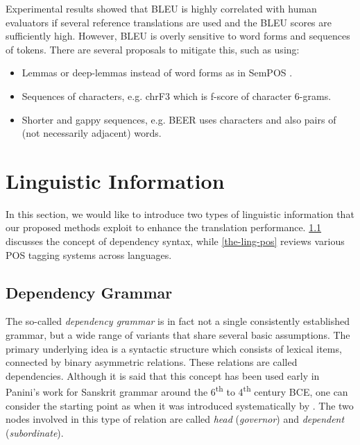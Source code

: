 Experimental results showed that BLEU is highly correlated with human evaluators if several reference translations are used and the BLEU scores are sufficiently high.
However, BLEU is overly sensitive to word forms and sequences of tokens.
There are several proposals to mitigate this, such as using:

\begin{itemize}
    \item Lemmas or deep-lemmas instead of word forms as in SemPOS \citep{Kos09evaluationof}.
    \item Sequences of characters, e.g. chrF3 \citep{chrf3} which is f-score of character 6-grams.
    \item Shorter and gappy sequences, e.g. BEER \citep{beer} uses characters and also pairs of (not necessarily adjacent) words.

\end{itemize}

\section{Linguistic Information}
\label{the-ling}

In this section, we would like to introduce two types of linguistic information that our proposed methods exploit to enhance the translation performance.
\cref{the-ling-dep} discusses the concept of dependency syntax, while \cref{the-ling-pos} reviews various POS tagging systems across languages.

\subsection{Dependency Grammar}
\label{the-ling-dep}

The so-called \textit{dependency grammar} is in fact not a single consistently established grammar, but a wide range of variants that share several basic assumptions.
The primary underlying idea is a syntactic structure which consists of lexical items, connected by binary asymmetric relations. 
These relations are called dependencies. 
Although it is said that this concept has been used early in Panini’s work for Sanskrit grammar around the 6\textsuperscript{th} to 4\textsuperscript{th} century BCE, one can consider the starting point as when it was introduced systematically by \cite{lucien1959elements}. 
The two nodes involved in this type of relation are called \textit{head} (\textit{governor})  and \textit{dependent} (\textit{subordinate}).

